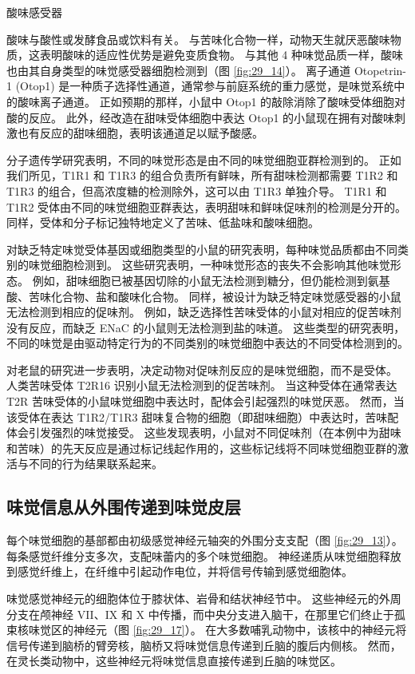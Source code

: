 酸味感受器

酸味与酸性或发酵食品或饮料有关。 与苦味化合物一样，动物天生就厌恶酸味物质，这表明酸味的适应性优势是避免变质食物。 与其他 4 种味觉品质一样，酸味也由其自身类型的味觉感受器细胞检测到（图 \ref{fig:29_14}）。 离子通道 Otopetrin-1 (Otop1) 是一种质子选择性通道，通常参与前庭系统的重力感觉，是味觉系统中的酸味离子通道。 正如预期的那样，小鼠中 Otop1 的敲除消除了酸味受体细胞对酸的反应。 此外，经改造在甜味受体细胞中表达 Otop1 的小鼠现在拥有对酸味刺激也有反应的甜味细胞，表明该通道足以赋予酸感。

分子遗传学研究表明，不同的味觉形态是由不同的味觉细胞亚群检测到的。 正如我们所见，T1R1 和 T1R3 的组合负责所有鲜味，所有甜味检测都需要 T1R2 和 T1R3 的组合，但高浓度糖的检测除外，这可以由 T1R3 单独介导。 T1R1 和 T1R2 受体由不同的味觉细胞亚群表达，表明甜味和鲜味促味剂的检测是分开的。 同样，受体和分子标记独特地定义了苦味、低盐味和酸味细胞。

对缺乏特定味觉受体基因或细胞类型的小鼠的研究表明，每种味觉品质都由不同类别的味觉细胞检测到。 这些研究表明，一种味觉形态的丧失不会影响其他味觉形态。 例如，甜味细胞已被基因切除的小鼠无法检测到糖分，但仍能检测到氨基酸、苦味化合物、盐和酸味化合物。 同样，被设计为缺乏特定味觉感受器的小鼠无法检测到相应的促味剂。 例如，缺乏选择性苦味受体的小鼠对相应的促苦味剂没有反应，而缺乏 ENaC 的小鼠则无法检测到盐的味道。 这些类型的研究表明，不同的味觉是由驱动特定行为的不同类别的味觉细胞中表达的不同受体检测到的。

对老鼠的研究进一步表明，决定动物对促味剂反应的是味觉细胞，而不是受体。 人类苦味受体 T2R16 识别小鼠无法检测到的促苦味剂。 当这种受体在通常表达 T2R 苦味受体的小鼠味觉细胞中表达时，配体会引起强烈的味觉厌恶。 然而，当该受体在表达 T1R2/T1R3 甜味复合物的细胞（即甜味细胞）中表达时，苦味配体会引发强烈的味觉接受。 这些发现表明，小鼠对不同促味剂（在本例中为甜味和苦味）的先天反应是通过标记线起作用的，这些标记线将不同味觉细胞亚群的激活与不同的行为结果联系起来。



\subsection{味觉信息从外围传递到味觉皮层}
每个味觉细胞的基部都由初级感觉神经元轴突的外围分支支配（图 \ref{fig:29_13}）。 每条感觉纤维分支多次，支配味蕾内的多个味觉细胞。 神经递质从味觉细胞释放到感觉纤维上，在纤维中引起动作电位，并将信号传输到感觉细胞体。

味觉感觉神经元的细胞体位于膝状体、岩骨和结状神经节中。 这些神经元的外周分支在颅神经 VII、IX 和 X 中传播，而中央分支进入脑干，在那里它们终止于孤束核味觉区的神经元（图 \ref{fig:29_17}）。 在大多数哺乳动物中，该核中的神经元将信号传递到脑桥的臂旁核，脑桥又将味觉信息传递到丘脑的腹后内侧核。 然而，在灵长类动物中，这些神经元将味觉信息直接传递到丘脑的味觉区。


